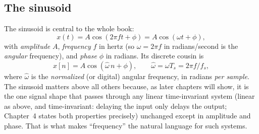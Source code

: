 \subsection{The sinusoid}
\label{ch02:sinusoid}

The sinusoid is central to the whole book:
\[
  x(t) = A\cos(2\pi f t + \phi) = A\cos(\omega t + \phi),
\]
with \emph{amplitude} $A$, \emph{frequency} $f$ in hertz (so $\omega = 2\pi f$ in
radians/second is the \emph{angular} frequency), and \emph{phase} $\phi$ in
radians. Its discrete cousin is
\[
  x[n] = A\cos(\hat\omega\, n + \phi), \qquad \hat\omega = \omega T_s = 2\pi f / f_s,
\]
where $\hat\omega$ is the \emph{normalized} (or digital) angular frequency, in
radians \emph{per sample}. The sinusoid matters above all others because, as later
chapters will show, it is the one signal shape that passes through any linear
time-invariant system (linear as above, and time-invariant: delaying the input
only delays the output; Chapter~4 states both properties precisely) unchanged except in amplitude and phase. That is what makes
``frequency'' the natural language for such systems.


